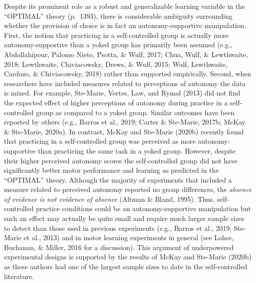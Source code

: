 \documentclass[
  english,
  doc, donotrepeattitle,floatsintext]{apa7}
\begin{document}
Despite its prominent role as a robust and generalizable learning variable in the ``OPTIMAL'' theory (p.~1393), there is considerable ambiguity surrounding whether the provision of choice is in fact an autonomy-supportive manipulation. First, the notion that practicing in a self-controlled group is actually more autonomy-supportive than a yoked group has primarily been assumed (e.g., Abdollahipour, Palomo Nieto, Psotta, \& Wulf, 2017; Chua, Wulf, \& Lewthwaite, 2018; Lewthwaite, Chiviacowsky, Drews, \& Wulf, 2015; Wulf, Lewthwaite, Cardozo, \& Chiviacowsky, 2018) rather than supported empirically. Second, when researchers have included measures related to perceptions of autonomy the data is mixed. For example, Ste-Marie, Vertes, Law, and Rymal (2013) did not find the expected effect of higher perceptions of autonomy during practice in a self-controlled group as compared to a yoked group. Similar outcomes have been reported by others (e.g., Barros et al., 2019; Carter \& Ste-Marie, 2017b; McKay \& Ste-Marie, 2020a). In contrast, McKay and Ste-Marie (2020b) recently found that practicing in a self-controlled group was perceived as more autonomy-supportive than practicing the same task in a yoked group. However, despite their higher perceived autonomy scores the self-controlled group did not have significantly better motor performance and learning as predicted in the ``OPTIMAL'' theory. Although the majority of experiments that included a measure related to perceived autonomy reported no group differences, the \emph{absence of evidence is not evidence of absence} (Altman \& Bland, 1995). Thus, self-controlled practice conditions could be an autonomy-supportive manipulation but such an effect may actually be quite small and require much larger sample sizes to detect than those used in previous experiments (e.g., Barros et al., 2019; Ste-Marie et al., 2013) and in motor learning experiments in general (see Lohse, Buchanan, \& Miller, 2016 for a discussion). This argument of underpowered experimental designs is supported by the results of McKay and Ste-Marie (2020b) as these authors had one of the largest sample sizes to date in the self-controlled literature.
\end{document}
